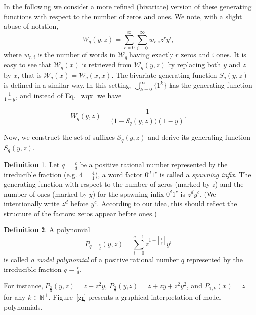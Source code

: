 \documentclass[a4paper,12pt]{article}
\theoremstyle{definition}
\newtheorem{definition}{Definition}
\newcommand{\W}{\mathcal{W}}
\newcommand{\N}{\mathbb{N}}
\def\S{\mathcal{S}}
\begin{document}
In the following we consider a more refined (bivariate) version of
these generating functions with respect to the number of zeros and
ones. We note, with a slight abuse of notation,
\begin{equation}
    W_q(y,z) = \sum_{r = 0}^{\infty} \sum_{i=0}^\infty w_{r,i} z^r y^i,
\end{equation}
where $w_{r,i}$ is the number of words in $\W_q$ having exactly $r$
zeros and $i$ ones. It is easy to see that $\W_q(x)$ is retrieved from
$\W_q(y,z)$ by replacing both $y$ and $z$ by $x$, that is $\W_q(x) =
\W_q (x,x)$. The bivariate generating function $S_q(y,z)$ is defined in a similar
way. In this setting, $\bigcup_{k=0}^{\infty} \{1^k\}$ has the
generating function $\frac{1}{1-y}$, and instead of Eq.~\eqref{wqx} we
have

\begin{equation}
  W_q(y,z) = \frac{1}{\big(1 - S_q(y,z)\big)(1-y)}.
  \label{wqe}
\end{equation}

\bigskip
Now, we construct the set of suffixes $\S_q(y,z)$ and derive its generating
function $S_q(y,z)$.

\begin{definition}
  Let $q = \frac{c}{d}$ be a positive rational number represented by
  the irreducible fraction (e.g. $4 = \frac{4}{1}$), a word factor
  $0^d1^c$ is called a {\em spawning infix}. The generating function
  with respect to the number of zeros (marked by $z$) and the number
  of ones (marked by $y$) for the spawning infix $0^d1^c$ is $z^dy^c$.
  (We intentionally write $z^d$ before $y^c$. According to our idea,
  this should reflect the structure of the factors: zeros appear
  before ones.)
  \label{infix}
\end{definition}

\begin{definition}
  A polynomial
  $$P_{q=\frac{c}{d}}(y,z) = \sum_{i=0}^{c-1} z^{1 + \left\lfloor
    \frac{i}{q} \right\rfloor} y^i $$ is called {\em a model
    polynomial} of a positive rational number $q$ represented by the
  irreducible fraction $q = \frac{c}{d}$.
\end{definition}

For instance, $P_{\frac{2}{3}} (y,z) = z + z^2y$, $P_{\frac{3}{2}}
(y,z) = z + zy + z^2y^2$, and $P_{1/k}(x) = z$ for any $k \in \N^+$.
Figure~\ref{gr} presents a graphical interpretation of model
polynomials.
\end{document}
